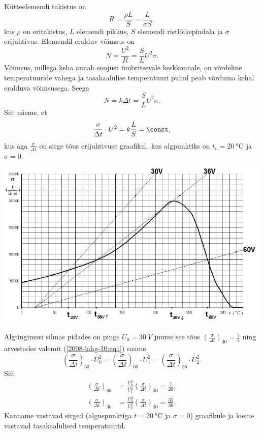 \documentclass[10pt, twoside]{article}
\begin{document}
{%

\solu
Kütteelemendi takistus on
\[
R=\frac{\rho L}{S}=\frac{L}{\sigma S},
\]
kus $\rho$ on eritakistus, $L$ elemendi pikkus, $S$ elemendi ristlõikepindala ja $\sigma$ erijuhtivus. Elemendil eralduv võimsus on
\[
N=\frac{U^{2}}{R}=\frac{S}{L} U^{2} \sigma.
\]
Võimsus, millega keha annab soojust ümbritsevale keskkonnale, on võrdeline temperatuuride vahega ja tasakaalulise temperatuuri puhul peab võrduma kehal eralduva võimsusega. Seega
\[
N=k \Delta t=\frac{S}{L} U^{2} \sigma.
\]
Siit näeme, et
\begin{equation} \label{2008-lahg-10:eq1}
\frac{\sigma}{\Delta t} \cdot U^{2}=k \frac{L}{S}=\const,
\end{equation}
kus aga $\frac{\sigma}{\Delta t}$
on sirge tõus erijuhtivuse graafikul, kus algpunktiks on $t_v = \SI{20}{\degreeCelsius}$ ja
$\sigma = \num{0}$.

\begin{center}
	\includegraphics[width=\linewidth]{2008-lahg-10-lah}
\end{center}

Algtingimusi silmas pidades on pinge $U_0 = \SI{30}{V}$ juures see tõus $\left(\frac{\sigma}{\Delta t}\right)_{30}=\frac{7}{5}$ ning arvestades valemit (\ref{2008-lahg-10:eq1}) saame
\[
\left(\frac{\sigma}{\Delta t}\right)_{30} \cdot U_{0}^{2}=\left(\frac{\sigma}{\Delta t}\right)_{60} \cdot U_{1}^{2}=\left(\frac{\sigma}{\Delta t}\right)_{36} \cdot U_{2}^{2}.
\]
Siit 
\[
\begin{aligned}\left(\frac{\sigma}{\Delta t}\right)_{60} &=\frac{U_{0}^{2}}{U_{1}^{2}}\left(\frac{\sigma}{\Delta t}\right)_{30}=\frac{7}{20}, \\\left(\frac{\sigma}{\Delta t}\right)_{36} &=\frac{U_{0}^{2}}{U_{2}^{2}}\left(\frac{\sigma}{\Delta t}\right)_{30}=\frac{35}{36}. \end{aligned}
\]
Kanname vastavad sirged (alguspunktiga $t = \SI{20}{\degreeCelsius}$ ja $\sigma = 0$) graafikule ja loeme vastavad tasakaalulised temperatuurid.

}
\end{document}
